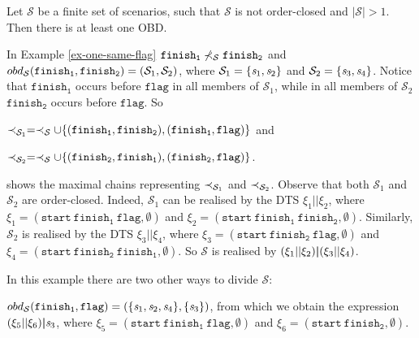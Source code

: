 \begin{obs}
\label{obs-not-order-closed}
Let $\mathcal{S}$ be a finite set of scenarios, such that
$\mathcal{S}$ is not order-closed and $|\mathcal{S}|>1$.
Then
there is at least one OBD.
\end{obs}
\noindent
In Example \ref{ex-one-same-flag}
$\mathtt{finish_1}\not\prec_{\mathcal{S}}\mathtt{finish_2}$ and
${obd}_{\mathcal{S}}(\mathtt{finish_1},\mathtt{finish_2})=(\mathcal{S}_{1},\mathcal{S}_2)$, where $\mathcal{S}_{1}=\{\mathit{s}_1,\mathit{s}_2\}$ and
$\mathcal{S}_2=\{\mathit{s}_3,\mathit{s}_4\}$.
Notice that $\mathtt{finish_1}$
occurs before $\mathtt{flag}$ in all members of $\mathcal{S}_{1}$,
while in all members of $\mathcal{S}_{2}$
$\mathtt{finish_2}$ occurs before $\mathtt{flag}$.
So

\noindent
$\prec_{\mathcal{S}_{1}}=\prec_{\mathcal{S}}\cup\{(\mathtt{finish_1},\mathtt{finish_2}),
(\mathtt{finish_1},\mathtt{flag})\}$ and

\noindent
$\prec_{\mathcal{S}_{2}}=\prec_{\mathcal{S}}\cup\{(\mathtt{finish_2},
\mathtt{finish_1}),(\mathtt{finish_2},\mathtt{flag})\}$.

 shows the maximal chains representing
$\prec_{\mathcal{S}_{1}}$ and $\prec_{\mathcal{S}_2}$.
Observe that both $\mathcal{S}_{1}$ and $\mathcal{S}_{2}$ are
order-closed. Indeed, ${\mathcal{S}}_{1}$ can be realised by
the DTS $\xi_1||\xi_2$, where
$\xi_1=(\mathtt{start}~ \mathtt{finish_1}~ \mathtt{flag},\emptyset)$
and
$\xi_2=(\mathtt{start}~ \mathtt{finish_1}~ \mathtt{finish_2},\emptyset)$.
Similarly, $\mathcal{S}_2$ is realised by %
the DTS $\xi_3||\xi_4$, where
$\xi_3=(\mathtt{start}~ \mathtt{finish_2}~ \mathtt{flag},\emptyset)$
and
$\xi_4=(\mathtt{start}~ \mathtt{finish_2}~ \mathtt{finish_1},\emptyset)$.
So
$\mathcal{S}$ is realised by $(\xi_1||\xi_2)\boldsymbol{|}(\xi_3||\xi_4)$.

In this example there are two other ways to divide $\mathcal{S}$:

\noindent
${obd}_{\mathcal{S}}(\mathtt{finish_1},\mathtt{flag})=(\{\mathit{s}_1,\mathit{s}_2,\mathit{s}_4\},\{\mathit{s}_3\})$,
from which we obtain the expression $(\xi_5||\xi_6)\boldsymbol{|}\mathit{s}_3$,
where
$\xi_5=(\mathtt{start}~ \mathtt{finish_1}~ \mathtt{flag},\emptyset)$
and
$\xi_6=(\mathtt{start}~ \mathtt{finish_2},\emptyset)$.

